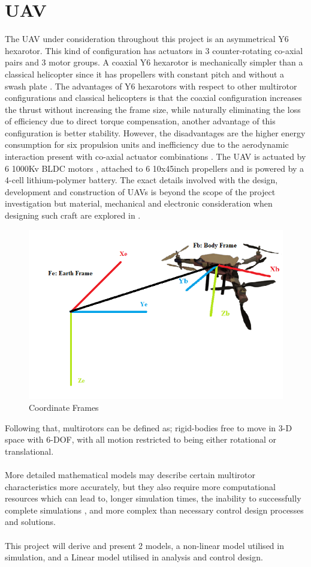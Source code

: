 \documentclass[12pt,a4paper,twoside]{report}
\begin{document}
		\section{UAV}
		
			The UAV under consideration throughout this project is an asymmetrical Y6 hexarotor. This kind of configuration has actuators in 3 counter-rotating co-axial pairs and 3 motor groups. A coaxial Y6 hexarotor is mechanically simpler than a classical helicopter since it has propellers with constant pitch and without a swash plate \cite{6}. The advantages of Y6 hexarotors with respect to other multirotor configurations and classical helicopters is that the coaxial configuration increases the thrust without increasing the frame size, while naturally eliminating the loss of efficiency due to direct torque compensation, another advantage of this configuration is better stability. However, the disadvantages are the higher energy consumption for six propulsion units and inefficiency due to the aerodynamic interaction present with co-axial actuator combinations \cite{9}. The UAV is actuated by 6 1000Kv BLDC motors \cite{14}, attached to 6 10x45inch propellers and is powered by a 4-cell lithium-polymer battery. The exact details involved with the design, development and construction of UAVs is beyond the scope of the project investigation but material, mechanical and electronic consideration when designing such craft are explored in \cite{12}.
			
			\begin{figure}[h!]
				\centering
				\includegraphics[width=0.7\linewidth]{UAVwithFrames.png}
				\caption{Coordinate Frames}
				\label{fig:Coordinate frames}
			\end{figure} 
		
			Following that, multirotors can be defined as; rigid-bodies free to move in 3-D space with 6-DOF, with all motion restricted to being either rotational or translational.
			\\ \\
			More detailed mathematical models may describe certain multirotor characteristics more accurately, but they also require more computational resources which can lead to, longer simulation times, the inability to successfully complete simulations \cite{5}, and more complex than necessary control design processes and solutions.
			\\ \\
			This project will derive and present 2 models, a non-linear model utilised in simulation, and a Linear model utilised in analysis and control design.
			
\end{document}
